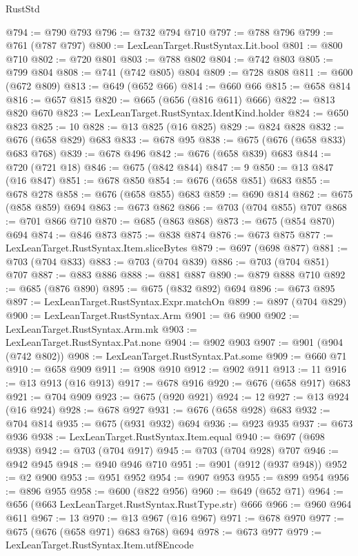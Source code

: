 \begin{lexlean}{RustStd}
\begin{coremodule}
{\begin{coremodule}
{{{{{{{{{{{{@794 := @790 @793
@796 := @732 @794 @710
@797 := @788 @796
@799 := @761 (@787 @797)
@800 := LexLeanTarget.RustSyntax.Lit.bool
@801 := @800 @710
@802 := @720 @801
@803 := @788 @802
@804 := @742 @803
@805 := @799 @804
@808 := @741 (@742 @805) @804
@809 := @728 @808
@811 := @600 (@672 @809)
@813 := @649 (@652 @66)
@814 := @660 @66
@815 := @658 @814
@816 := @657 @815
@820 := @665 (@656 (@816 @611) @666)
@822 := @813 @820 @670
@823 := LexLeanTarget.RustSyntax.IdentKind.holder
@824 := @650 @823
@825 := 10
@828 := @13 @825 (@16 @825)
@829 := @824 @828
@832 := @676 (@658 @829) @683
@833 := @678 @95
@838 := @675 (@676 (@658 @833) @683 @768)
@839 := @678 @496
@842 := @676 (@658 @839) @683
@844 := @720 (@721 @18)
@846 := @675 (@842 @844)
@847 := 9
@850 := @13 @847 (@16 @847)
@851 := @678 @850
@854 := @676 (@658 @851) @683
@855 := @678 @278
@858 := @676 (@658 @855) @683
@859 := @690 @814
@862 := @675 (@858 @859) @694
@863 := @673 @862
@866 := @703 (@704 @855) @707
@868 := @701 @866 @710
@870 := @685 (@863 @868)
@873 := @675 (@854 @870) @694
@874 := @846 @873
@875 := @838 @874
@876 := @673 @875
@877 := LexLeanTarget.RustSyntax.Item.sliceBytes
@879 := @697 (@698 @877)
@881 := @703 (@704 @833)
@883 := @703 (@704 @839)
@886 := @703 (@704 @851) @707
@887 := @883 @886
@888 := @881 @887
@890 := @879 @888 @710
@892 := @685 (@876 @890)
@895 := @675 (@832 @892) @694
@896 := @673 @895
@897 := LexLeanTarget.RustSyntax.Expr.matchOn
@899 := @897 (@704 @829)
@900 := LexLeanTarget.RustSyntax.Arm
@901 := @6 @900
@902 := LexLeanTarget.RustSyntax.Arm.mk
@903 := LexLeanTarget.RustSyntax.Pat.none
@904 := @902 @903
@907 := @901 (@904 (@742 @802))
@908 := LexLeanTarget.RustSyntax.Pat.some
@909 := @660 @71
@910 := @658 @909
@911 := @908 @910
@912 := @902 @911
@913 := 11
@916 := @13 @913 (@16 @913)
@917 := @678 @916
@920 := @676 (@658 @917) @683
@921 := @704 @909
@923 := @675 (@920 @921)
@924 := 12
@927 := @13 @924 (@16 @924)
@928 := @678 @927
@931 := @676 (@658 @928) @683
@932 := @704 @814
@935 := @675 (@931 @932) @694
@936 := @923 @935
@937 := @673 @936
@938 := LexLeanTarget.RustSyntax.Item.equal
@940 := @697 (@698 @938)
@942 := @703 (@704 @917)
@945 := @703 (@704 @928) @707
@946 := @942 @945
@948 := @940 @946 @710
@951 := @901 (@912 (@937 @948))
@952 := @2 @900
@953 := @951 @952
@954 := @907 @953
@955 := @899 @954
@956 := @896 @955
@958 := @600 (@822 @956)
@960 := @649 (@652 @71)
@964 := @656 (@663 LexLeanTarget.RustSyntax.RustType.str) @666
@966 := @960 @964 @611
@967 := 13
@970 := @13 @967 (@16 @967)
@971 := @678 @970
@977 := @675 (@676 (@658 @971) @683 @768) @694
@978 := @673 @977
@979 := LexLeanTarget.RustSyntax.Item.utf8Encode
}}}}}}}}}}}}
\end{coremodule}}
\end{coremodule}
\end{lexlean}
